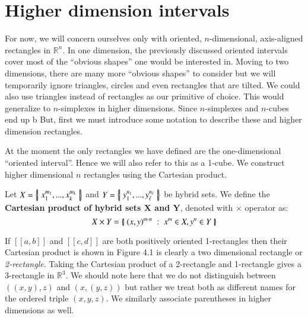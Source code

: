 %
%

\section{Higher dimension intervals}

For now, we will concern ourselves only with oriented, $n$-dimensional, axis-aligned rectangles in $\mathbb{R}^n$.
In one dimension, the previously discussed oriented intervals cover most of the ``obvious shapes'' one would be interested in.
Moving to two dimensions, there are many more ``obvious shapes'' to consider but we will temporarily ignore triangles, circles and even rectangles that are tilted.
We could also use triangles instead of rectangles as our primitive of choice. 
This would generalize to $n$-simplexes in higher dimensions.
Since $n$-simplexes and $n$-cubes end up b\cite{choquetanalysis}
But, first we must introduce some notation to describe these and higher dimension rectangles. 

At the moment the only rectangles we have defined are the one-dimensional ``oriented interval''.
Hence we will also refer to this as a 1-cube.
We construct higher dimensional $n$ rectangles using the Cartesian product.
\begin{definition}
	Let $X = \left\{ \! \left| \;  x_1^{m_1}, ... , x_k^{m_k}  \; \right| \! \right\}$ and $Y= \left\{ \! \left| \;  y_1^{n_1}, ... , y_\ell^{n_\ell}  \; \right| \! \right\}$ be hybrid sets.
	We define the \textbf{Cartesian product of hybrid sets $\boldsymbol{X}$ and $\boldsymbol{Y}$}, denoted with $\times$ operator as:
	\begin{equation}
		X \times Y = \left\{ \! \left| \;  (x, y)^{m \cdot n} \; : \; x^m \in X, y^n \in Y  \; \right| \! \right\}
	 \end{equation}
\end{definition}

If $[\![a,b]\!]$ and $[\![c,d]\!]$ are both positively oriented 1-rectangles then their Cartesian product is shown in Figure 4.1 is clearly a two dimensional rectangle or \emph{2-rectangle}. 
Taking the Cartesian product of a 2-rectangle and 1-rectangle gives a 3-rectangle in $\mathbb{R}^3$. 
We should note here that we do not distinguish between $((x,y),z)$ and $(x,(y,z))$ but rather we treat both as different names for the ordered triple $(x,y,z)$.
We similarly associate parentheses in higher dimensions as well.

